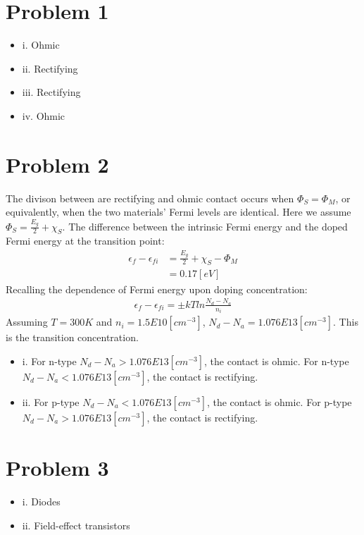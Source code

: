 \documentclass{article}
\numberwithin{equation}{section}
\begin{document}
\section*{Problem 1}
\begin{itemize}
\item i. Ohmic
\item ii. Rectifying
\item iii. Rectifying
\item iv. Ohmic
\end{itemize}  

\section*{Problem 2}
The divison between are rectifying and ohmic contact occurs when $\Phi_S=\Phi_M$, or equivalently, when the two materials' Fermi levels are identical. Here we assume $\Phi_S=\frac{E_g}{2}+\chi_S$. The difference between the intrinsic Fermi energy and the doped Fermi energy at the transition point:
\begin{align*}
\epsilon_f-\epsilon_{fi}&=\frac{E_g}{2}+\chi_S-\Phi_M\\
			&=0.17[eV]
\end{align*}
Recalling the dependence of Fermi energy upon doping concentration:
\begin{align*}
\epsilon_f-\epsilon_{fi}=\pm kTln\frac{N_d-N_a}{n_i}
\end{align*}
Assuming $T=300K$ and $n_i=1.5E10[cm^{-3}]$, $N_d-N_a=1.076E13[cm^{-3}]$. This is the transition concentration.
\begin{itemize}
\item i. For n-type $N_d-N_a>1.076E13[cm^{-3}]$, the contact is ohmic. For n-type $N_d-N_a<1.076E13[cm^{-3}]$, the contact is rectifying.
\item ii. For p-type $N_d-N_a<1.076E13[cm^{-3}]$, the contact is ohmic. For p-type $N_d-N_a>1.076E13[cm^{-3}]$, the contact is rectifying.
\end{itemize}
\section*{Problem 3}
\begin{itemize}
\item i. Diodes
\item ii. Field-effect transistors 
\end{itemize}
\end{document}
